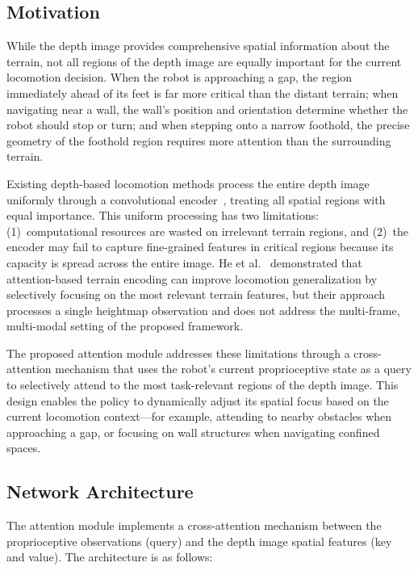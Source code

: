 \subsection{Motivation}

While the depth image provides comprehensive spatial information about the terrain, not all regions of the depth image are equally important for the current locomotion decision. When the robot is approaching a gap, the region immediately ahead of its feet is far more critical than the distant terrain; when navigating near a wall, the wall's position and orientation determine whether the robot should stop or turn; and when stepping onto a narrow foothold, the precise geometry of the foothold region requires more attention than the surrounding terrain.

Existing depth-based locomotion methods process the entire depth image uniformly through a convolutional encoder~\cite{zhu2024hiking,zhuang2024humanoidparkour}, treating all spatial regions with equal importance. This uniform processing has two limitations: (1)~computational resources are wasted on irrelevant terrain regions, and (2)~the encoder may fail to capture fine-grained features in critical regions because its capacity is spread across the entire image. He et al.~\cite{he2024attentionmap} demonstrated that attention-based terrain encoding can improve locomotion generalization by selectively focusing on the most relevant terrain features, but their approach processes a single heightmap observation and does not address the multi-frame, multi-modal setting of the proposed framework.

The proposed attention module addresses these limitations through a cross-attention mechanism that uses the robot's current proprioceptive state as a query to selectively attend to the most task-relevant regions of the depth image. This design enables the policy to dynamically adjust its spatial focus based on the current locomotion context---for example, attending to nearby obstacles when approaching a gap, or focusing on wall structures when navigating confined spaces.

\subsection{Network Architecture}

The attention module implements a cross-attention mechanism between the proprioceptive observations (query) and the depth image spatial features (key and value). The architecture is as follows:

